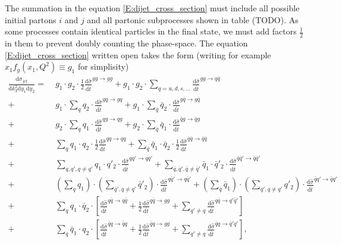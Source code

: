 \documentclass[a4paper, twoside, english, 12pt]{article}
\begin{document}
The summation in the equation \eqref{E:dijet_cross_section} must include all possible initial partons $i$ and $j$ and all partonic subprocesses shown in table (TODO). As some processes contain identical particles in the final state, we must add factors $\frac{1}{2}$ in them to prevent doubly counting the phase-space. The equation \eqref{E:dijet_cross_section} written open takes the form (writing for example $x_1f_g(x_1,Q^2)\equiv g_1$ for simplisity)
\begin{align}\label{E:partonic_bookkeeping}
	\frac{\text{d}\sigma_{jet}}{\text{d}k_T^2\text{d}y_1\text{d}y_2} =\;  &g_1\cdot g_2 \cdot \frac{1}{2}\frac{\text{d}\hat{\sigma}}{\text{d}\hat{t}}^{gg\rightarrow gg} + g_1\cdot g_2 \cdot \sum\limits_{q=u,d,s,\dots}\frac{\text{d}\hat{\sigma}}{\text{d}\hat{t}}^{gg\rightarrow q\bar{q}} \nonumber\\[1em]
	+&g_1\cdot \sum\limits_{q}q_2 \cdot \frac{\text{d}\hat{\sigma}}{\text{d}\hat{t}}^{gq\rightarrow gq} + g_1\cdot \sum\limits_{\bar{q}}\bar{q}_2 \cdot \frac{\text{d}\hat{\sigma}}{\text{d}\hat{t}}^{g\bar{q}\rightarrow g\bar{q}} \nonumber\\[0.3em]
	+&g_2\cdot \sum\limits_{q}q_1 \cdot \frac{\text{d}\hat{\sigma}}{\text{d}\hat{t}}^{qg\rightarrow qg} + g_2\cdot \sum\limits_{\bar{q}}\bar{q}_1 \cdot \frac{\text{d}\hat{\sigma}}{\text{d}\hat{t}}^{\bar{q}g\rightarrow \bar{q}g} \nonumber\\[1em]
	+&\sum\limits_{q} q_1\cdot q_2 \cdot \frac{1}{2}\frac{\text{d}\hat{\sigma}}{\text{d}\hat{t}}^{qq\rightarrow qq} + \sum\limits_{\bar{q}} \bar{q}_1\cdot \bar{q}_2 \cdot \frac{1}{2}\frac{\text{d}\hat{\sigma}}{\text{d}\hat{t}}^{\bar{q}\bar{q}\rightarrow \bar{q}\bar{q}} \nonumber\\[1.5em]
	+&\sum\limits_{q, q', q\neq q'} q_1\cdot q'_2 \cdot \frac{\text{d}\hat{\sigma}}{\text{d}\hat{t}}^{qq'\rightarrow qq'} + \sum\limits_{\bar{q}, \bar{q}', \bar{q}\neq\bar{q}'} \bar{q}_1\cdot \bar{q}'_2 \cdot \frac{\text{d}\hat{\sigma}}{\text{d}\hat{t}}^{\bar{q}\bar{q}'\rightarrow \bar{q}\bar{q}'} \nonumber\\[0.3em]
	+&\left(\sum\limits_{q} q_1\right)\cdot \left(\sum\limits_{\bar{q}', q\neq q'}\bar{q}'_2\right) \cdot \frac{\text{d}\hat{\sigma}}{\text{d}\hat{t}}^{q\bar{q}'\rightarrow q\bar{q}'} + \left(\sum\limits_{\bar{q}} \bar{q}_1\right)\cdot \left(\sum\limits_{q', q\neq q'}q'_2\right) \cdot \frac{\text{d}\hat{\sigma}}{\text{d}\hat{t}}^{\bar{q}q'\rightarrow \bar{q}q'} \nonumber\\[2em]
	+&\sum\limits_{q} q_1\cdot \bar{q}_2 \cdot \left[\frac{\text{d}\hat{\sigma}}{\text{d}\hat{t}}^{q\bar{q}\rightarrow q\bar{q}} + \frac{1}{2}\frac{\text{d}\hat{\sigma}}{\text{d}\hat{t}}^{q\bar{q}\rightarrow gg} +\sum\limits_{q'\neq q}\frac{\text{d}\hat{\sigma}}{\text{d}\hat{t}}^{q\bar{q}\rightarrow q'\bar{q}'} \right] \nonumber\\[0.3em]
	+&\sum\limits_{q} \bar{q}_1\cdot q_2 \cdot \left[\frac{\text{d}\hat{\sigma}}{\text{d}\hat{t}}^{\bar{q}q\rightarrow \bar{q}q} + \frac{1}{2}\frac{\text{d}\hat{\sigma}}{\text{d}\hat{t}}^{\bar{q}q\rightarrow gg} +\sum\limits_{q'\neq q}\frac{\text{d}\hat{\sigma}}{\text{d}\hat{t}}^{\bar{q}q\rightarrow \bar{q}'q'} \right],
\end{align}
\end{document}
